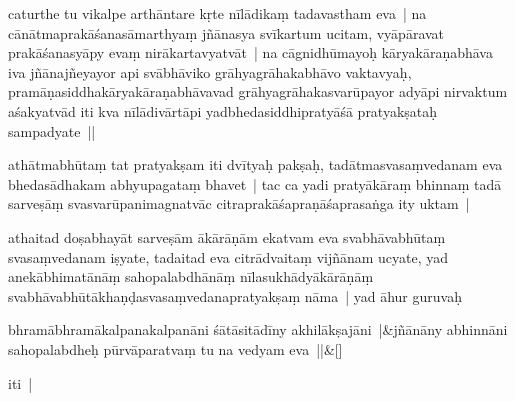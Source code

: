 \documentclass[article,12pt,a4paper]{memoir}%
\newcounter{parCount}
\begin{document}
	  \pstart \leavevmode%
	\label{thakur75-142.18}caturthe tu vikalpe arthāntare kṛte nīlādikaṃ tadavastham eva | na cānātmaprakāśanasāmarthyaṃ jñānasya svīkartum ucitam, vyāpāravat prakāśanasyāpy evaṃ nirākartavyatvāt | na cāgnidhūmayoḥ kāryakāraṇabhāva iva jñānajñeyayor api svābhāviko grāhyagrāhakabhāvo vaktavyaḥ, pramāṇasiddhakāryakāraṇabhāvavad grāhyagrāhakasvarūpayor adyāpi nirvaktum aśakyatvād iti kva nīlādivārtāpi yadbhedasiddhipratyāśā pratyakṣataḥ sampadyate ||
	{}
	\pend%
      

	  \pstart \leavevmode%
	\label{thakur75-142.24}athātmabhūtaṃ tat pratyakṣam iti dvītyaḥ pakṣaḥ, tadātmasvasaṃvedanam eva bhedasādhakam abhyupagataṃ bhavet | tac ca yadi pratyākāraṃ bhinnaṃ tadā sarveṣāṃ svasvarūpanimagnatvāc citraprakāśapraṇāśaprasaṅga ity uktam |
	{}
	\pend%
      

	  \pstart \leavevmode%
	\label{thakur75-142.27}athaitad doṣabhayāt sarveṣām ākārāṇām ekatvam eva svabhāvabhūtaṃ svasaṃvedanam iṣyate, tadaitad eva citrādvaitaṃ vijñānam ucyate, yad anekābhimatānāṃ sahopalabdhānāṃ nīlasukhādyākārāṇāṃ svabhāvabhūtākhaṇḍasvasaṃvedanapratyakṣaṃ nāma | yad āhur guruvaḥ
	{}
	\pend%
      
	    
	    \stanza[\smallbreak]
	  bhramābhramākalpanakalpanāni śātāsitādīny akhilākṣajāni |&jñānāny abhinnāni sahopalabdheḥ pūrvāparatvaṃ tu na vedyam eva ||\&[\smallbreak]
	  
	  
	  

	  \pstart \leavevmode%
	iti |
	{}
	\pend%
      
\end{document}
